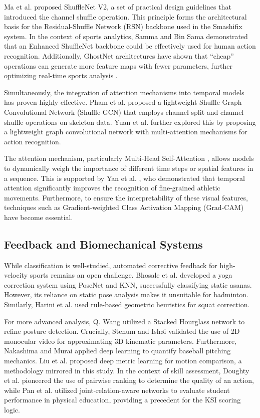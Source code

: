 \documentclass[pdflatex,sn-mathphys-num]{sn-jnl}
\theoremstyle{thmstyleone}%
\theoremstyle{thmstyletwo}%
\theoremstyle{thmstylethree}%
\begin{document}
Ma et al. \cite{b24} proposed ShuffleNet V2, a set of practical design guidelines that introduced the channel shuffle operation. This principle forms the architectural basis for the Residual-Shuffle Network (RSN) backbone used in the Smashifix system. In the context of sports analytics, Samma and Bin Sama \cite{b25} demonstrated that an Enhanced ShuffleNet backbone could be effectively used for human action recognition. Additionally, GhostNet architectures have shown that ``cheap'' operations can generate more feature maps with fewer parameters, further optimizing real-time sports analysis \cite{b26}.

Simultaneously, the integration of attention mechanisms into temporal models has proven highly effective. Pham et al. \cite{b27} proposed a lightweight Shuffle Graph Convolutional Network (Shuffle-GCN) that employs channel split and channel shuffle operations on skeleton data. Yuan et al. \cite{b28} further explored this by proposing a lightweight graph convolutional network with multi-attention mechanisms for action recognition.

The attention mechanism, particularly Multi-Head Self-Attention \cite{b29}, allows models to dynamically weigh the importance of different time steps or spatial features in a sequence. This is supported by Yan et al. \cite{b30}, who demonstrated that temporal attention significantly improves the recognition of fine-grained athletic movements. Furthermore, to ensure the interpretability of these visual features, techniques such as Gradient-weighted Class Activation Mapping (Grad-CAM) \cite{b31} have become essential.

\subsection{Feedback and Biomechanical Systems}
While classification is well-studied, automated corrective feedback for high-velocity sports remains an open challenge. Bhosale et al. \cite{b32} developed a yoga correction system using PoseNet and KNN, successfully classifying static asanas. However, its reliance on static pose analysis makes it unsuitable for badminton. Similarly, Harini et al. \cite{b33} used rule-based geometric heuristics for squat correction. 

For more advanced analysis, Q. Wang \cite{b34} utilized a Stacked Hourglass network to refine posture detection. Crucially, Stenum and Ish\o i \cite{b35} validated the use of 2D monocular video for approximating 3D kinematic parameters. Furthermore, Nakashima and Murai \cite{b36} applied deep learning to quantify baseball pitching mechanics. Liu et al. \cite{b37} proposed deep metric learning for motion comparison, a methodology mirrored in this study. In the context of skill assessment, Doughty et al. \cite{b38} pioneered the use of pairwise ranking to determine the quality of an action, while Pan et al. \cite{b39} utilized joint-relation-aware networks to evaluate student performance in physical education, providing a precedent for the KSI scoring logic.
\end{document}
